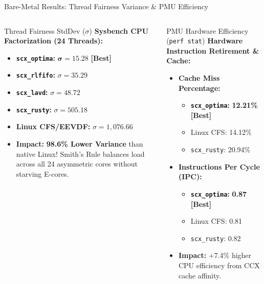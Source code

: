 \documentclass{beamer}
\begin{document}
\begin{frame}{Bare-Metal Results: Thread Fairness Variance \& PMU Efficiency}
  \begin{columns}[T]
      \begin{block}{\small Thread Fairness StdDev ($\sigma$)}
        \footnotesize
        \textbf{Sysbench CPU Factorization (24 Threads):}
        \begin{itemize}\itemsep2pt\tiny
          \item \textbf{\texttt{scx\_optima}:} $\mathbf{\sigma = 15.28}$ \textcolor{AccentOrange}{\textbf{[Best]}}
          \item \textbf{\texttt{scx\_rlfifo}:} $\sigma = 35.29$
          \item \textbf{\texttt{scx\_lavd}:} $\sigma = 48.72$
          \item \textbf{\texttt{scx\_rusty}:} $\sigma = 505.18$
          \item \textbf{Linux CFS/EEVDF:} $\sigma = 1,076.66$
          \item \textbf{Impact:} \textbf{98.6\% Lower Variance} than native Linux! Smith's Rule balances load across all 24 asymmetric cores without starving E-cores.
        \end{itemize}
      \end{block}

      \begin{exampleblock}{\small PMU Hardware Efficiency (\texttt{perf stat})}
        \footnotesize
        \textbf{Hardware Instruction Retirement \& Cache:}
        \begin{itemize}\itemsep2pt\tiny
          \item \textbf{Cache Miss Percentage:}
                \begin{itemize}\tiny
                  \item \textbf{\texttt{scx\_optima}:} \textbf{12.21\%} \textcolor{AccentOrange}{\textbf{[Best]}}
                  \item Linux CFS: 14.12\%
                  \item \texttt{scx\_rusty}: 20.94\%
                \end{itemize}
          \item \textbf{Instructions Per Cycle (IPC):}
                \begin{itemize}\tiny
                  \item \textbf{\texttt{scx\_optima}:} \textbf{0.87} \textcolor{AccentOrange}{\textbf{[Best]}}
                  \item Linux CFS: 0.81
                  \item \texttt{scx\_rusty}: 0.82
                \end{itemize}
          \item \textbf{Impact:} +7.4\% higher CPU efficiency from CCX cache affinity.
        \end{itemize}
      \end{exampleblock}
  \end{columns}
\end{frame}
\end{document}
